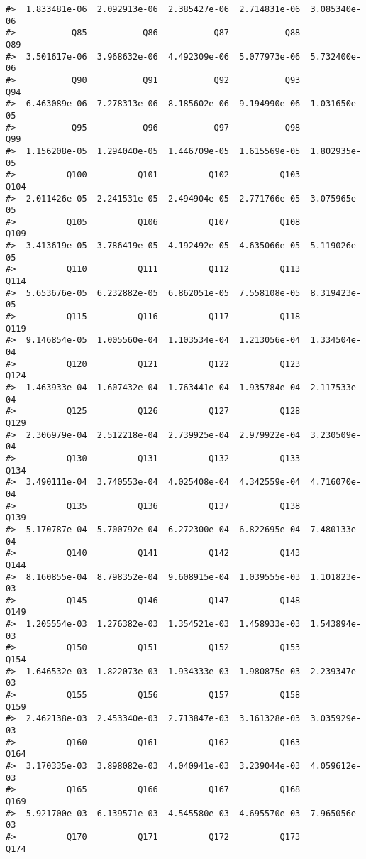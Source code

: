 \documentclass[]{article}
\begin{document}
\begin{verbatim}
#>  1.833481e-06  2.092913e-06  2.385427e-06  2.714831e-06  3.085340e-06 
#>           Q85           Q86           Q87           Q88           Q89 
#>  3.501617e-06  3.968632e-06  4.492309e-06  5.077973e-06  5.732400e-06 
#>           Q90           Q91           Q92           Q93           Q94 
#>  6.463089e-06  7.278313e-06  8.185602e-06  9.194990e-06  1.031650e-05 
#>           Q95           Q96           Q97           Q98           Q99 
#>  1.156208e-05  1.294040e-05  1.446709e-05  1.615569e-05  1.802935e-05 
#>          Q100          Q101          Q102          Q103          Q104 
#>  2.011426e-05  2.241531e-05  2.494904e-05  2.771766e-05  3.075965e-05 
#>          Q105          Q106          Q107          Q108          Q109 
#>  3.413619e-05  3.786419e-05  4.192492e-05  4.635066e-05  5.119026e-05 
#>          Q110          Q111          Q112          Q113          Q114 
#>  5.653676e-05  6.232882e-05  6.862051e-05  7.558108e-05  8.319423e-05 
#>          Q115          Q116          Q117          Q118          Q119 
#>  9.146854e-05  1.005560e-04  1.103534e-04  1.213056e-04  1.334504e-04 
#>          Q120          Q121          Q122          Q123          Q124 
#>  1.463933e-04  1.607432e-04  1.763441e-04  1.935784e-04  2.117533e-04 
#>          Q125          Q126          Q127          Q128          Q129 
#>  2.306979e-04  2.512218e-04  2.739925e-04  2.979922e-04  3.230509e-04 
#>          Q130          Q131          Q132          Q133          Q134 
#>  3.490111e-04  3.740553e-04  4.025408e-04  4.342559e-04  4.716070e-04 
#>          Q135          Q136          Q137          Q138          Q139 
#>  5.170787e-04  5.700792e-04  6.272300e-04  6.822695e-04  7.480133e-04 
#>          Q140          Q141          Q142          Q143          Q144 
#>  8.160855e-04  8.798352e-04  9.608915e-04  1.039555e-03  1.101823e-03 
#>          Q145          Q146          Q147          Q148          Q149 
#>  1.205554e-03  1.276382e-03  1.354521e-03  1.458933e-03  1.543894e-03 
#>          Q150          Q151          Q152          Q153          Q154 
#>  1.646532e-03  1.822073e-03  1.934333e-03  1.980875e-03  2.239347e-03 
#>          Q155          Q156          Q157          Q158          Q159 
#>  2.462138e-03  2.453340e-03  2.713847e-03  3.161328e-03  3.035929e-03 
#>          Q160          Q161          Q162          Q163          Q164 
#>  3.170335e-03  3.898082e-03  4.040941e-03  3.239044e-03  4.059612e-03 
#>          Q165          Q166          Q167          Q168          Q169 
#>  5.921700e-03  6.139571e-03  4.545580e-03  4.695570e-03  7.965056e-03 
#>          Q170          Q171          Q172          Q173          Q174 

\end{verbatim}
\end{document}
